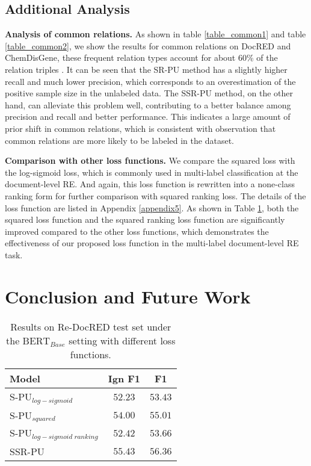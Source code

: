 \documentclass[11pt]{article}
\begin{document}
\subsection{Additional Analysis}

\textbf{Analysis of common relations.} \enspace As shown in table \ref{table_common1} and table \ref{table_common2}, we show the results for common relations on DocRED and ChemDisGene, these frequent relation types account for about 60\% of the relation triples \citep{tan2022revisiting,zhang-etal-2022-distant}. It can be seen that the SR-PU method has a slightly higher recall and much lower precision, which corresponds to an overestimation of the positive sample size in the unlabeled data. The SSR-PU method, on the other hand, can alleviate this problem well, contributing to a better balance among precision and recall and better performance. This indicates a large amount of prior shift in common relations, which is consistent with \citep{huang-etal-2022-recommend} observation that common relations are more likely to be labeled in the dataset.

\textbf{Comparison with other loss functions.} \label{c4} \enspace We compare the squared loss with the log-sigmoid loss, which is commonly used in multi-label classification at the document-level RE. And again, this loss function is rewritten into a none-class ranking form for further comparison with squared ranking loss. The details of the loss function are listed in Appendix \ref{appendix5}. As shown in Table \ref{table6}, both the squared loss function and the squared ranking loss function are significantly improved compared to the other loss functions, which demonstrates the effectiveness of our proposed loss function in the multi-label document-level RE task.

\section{Conclusion and Future Work}

\begin{table}
\centering
\begin{tabular}{lcc}
\hline \textbf{Model} & \textbf{Ign F1} & \textbf{F1} \\
\hline
S-PU$_{log-sigmoid}$ & $52.23$ & $53.43$ \\
S-PU$_{squared}$ & $54.00$ & $55.01$ \\
\hline
S-PU$_{log-sigmoid \; ranking}$ & $52.42$ & $53.66$ \\
SSR-PU & $55.43$ & $56.36$ \\
\hline
\end{tabular}
\caption{\label{table6}
Results on Re-DocRED test set under the $\mathrm{BERT}_{Base}$ setting with different loss functions.
}
\end{table}
\end{document}
